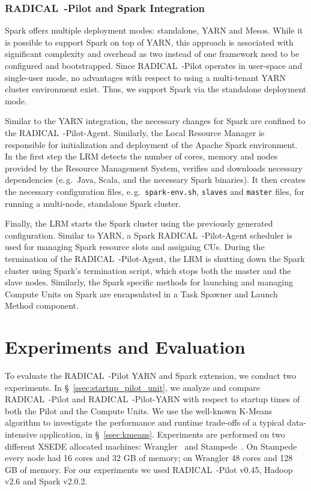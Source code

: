 \subsubsection*{RADICAL~-Pilot and Spark Integration}
\label{sssec:rp_spark}
Spark offers multiple deployment modes: standalone, YARN and Mesos.
While it is possible to support Spark on top of YARN, this approach is associated with significant complexity and overhead as two instead of one framework need to be configured and bootstrapped.
Since RADICAL~-Pilot operates in user-space and single-user mode, no advantages with respect to using a multi-tenant YARN cluster environment exist.
Thus, we support Spark via the standalone deployment mode.

Similar to the YARN integration, the necessary changes for Spark are confined to the RADICAL~-Pilot-Agent.
Similarly, the Local Resource Manager is responsible for initialization and deployment of the Apache Spark environment.
In the first step the LRM detects the number of cores, memory and nodes provided by the Resource Management System, verifies and downloads necessary dependencies (e.\,g.\ Java, Scala, and the necessary Spark binaries).
It then creates the necessary configuration files, e.\,g.\ \texttt{spark-env.sh}, \texttt{slaves} and \texttt{master} files, for running a multi-node, standalone Spark cluster.

Finally, the LRM starts the Spark cluster using the previously generated configuration.
Similar to YARN, a Spark RADICAL~-Pilot-Agent scheduler is used for managing Spark resource slots and assigning CUs.
During the termination of the RADICAL~-Pilot-Agent, the LRM is shutting down the Spark cluster using Spark’s termination script, which stops both the master and the slave nodes.
Similarly, the Spark specific methods for launching and managing Compute Units on Spark are encapsulated in a Task Spawner and Launch Method component.

\section{Experiments and Evaluation}
\label{sec:rph-exps}

To evaluate the RADICAL~-Pilot YARN and Spark extension, we conduct two experiments.
In \S~\ref{ssec:startup_pilot_unit}, we analyze and compare RADICAL~-Pilot and RADICAL~-Pilot-YARN with respect to startup times of both the Pilot and the Compute Units.
We use the well-known K-Means algorithm to investigate the performance and runtime trade-offs of a typical data-intensive application, in \S~\ref{ssec:kmeans}.
Experiments are performed on two different XSEDE allocated machines: Wrangler~\cite{wrangler} and Stampede~\cite{stampede}.
On Stampede every node had 16 cores and 32 GB of memory; on Wrangler 48 cores and 128 GB of memory.
For our experiments we used RADICAL~-Pilot v0.45, Hadoop v2.6 and Spark v2.0.2.

